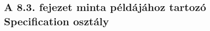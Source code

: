 \appendix
\chapter*{\fuggelek}
\setcounter{chapter}{\appendixnumber}

\section{A 8.3. fejezet minta példájához tartozó Specification osztály}
